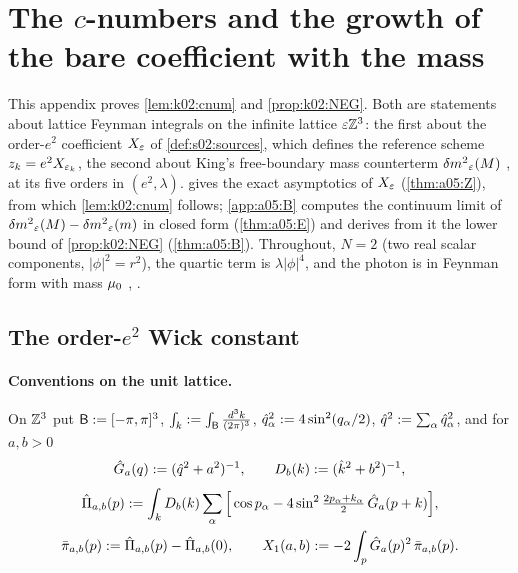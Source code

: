 \providecommand{\NEGinf}{\ensuremath{(\mathrm{NEG}_{\infty})}}
\providecommand{\BZ}{\ensuremath{\mathsf B}}
\providecommand{\Bc}{\ensuremath{B^{\mathrm c}}}
\providecommand{\Gh}{\ensuremath{\hat G}}
\providecommand{\intk}{\ensuremath{\int_{k}}}
\providecommand{\intp}{\ensuremath{\int_{p}}}

\section{The $c$-numbers and the growth of the bare coefficient with the mass}\label{app:a05_cnum_NEG}

This appendix proves \cref{lem:k02:cnum} and \cref{prop:k02:NEG}. Both are statements about lattice Feynman integrals on the infinite lattice $\varepsilon\mathbb Z^3$: the first about the order-$e^2$ coefficient $X_{\varepsilon}$ of \cref{def:s02:sources}, which defines the reference scheme $z_k=e^2X_{\varepsilon_k}$, the second about King's free-boundary mass counterterm ${\delta m^2}_{\varepsilon}(M)$ \cite[(3.32)--(3.33)]{K1}, \cite[p.~330]{K2} at its five orders in $(e^2,\lambda)$.  gives the exact asymptotics of $X_{\varepsilon}$ (\cref{thm:a05:Z}), from which \cref{lem:k02:cnum} follows; \cref{app:a05:B} computes the continuum limit of ${\delta m^2}_{\varepsilon}(M)-{\delta m^2}_{\varepsilon}(m)$ in closed form (\cref{thm:a05:E}) and derives from it the lower bound of \cref{prop:k02:NEG} (\cref{thm:a05:B}). Throughout, $N=2$ (two real scalar components, $|\phi|^2=r^2$), the quartic term is $\lambda|\phi|^4$, and the photon is in Feynman form with mass $\mu_0$ \cite[(2.4)]{K1}, \cite[(2.5)]{K2}.

\subsection{The order-$e^2$ Wick constant}\label{app:a05:A}

\paragraph{Conventions on the unit lattice.} On $\mathbb Z^3$ put $\BZ\defeq[-\pi,\pi]^3$, $\intk\defeq\int_\BZ\frac{d^3k}{(2\pi)^3}$, $\hat q_\alpha^2:=4\sin^2(q_\alpha/2)$, $\hat q^2:=\sum_\alpha\hat q_\alpha^2$, and for $a,b>0$
\[
\Gh_a(q)\defeq(\hat q^2+a^2)^{-1},\qquad D_b(k)\defeq(\hat k^2+b^2)^{-1},
\]
\begin{gather*}
\hat\Pi_{a,b}(p)\defeq\intk D_b(k)\sum_\alpha\Big[\cos p_\alpha-4\sin^2\tfrac{2p_\alpha+k_\alpha}2\,\Gh_a(p+k)\Big],\\
\bar\pi_{a,b}(p)\defeq\hat\Pi_{a,b}(p)-\hat\Pi_{a,b}(0),\qquad X_1(a,b)\defeq-2\intp\Gh_a(p)^2\,\bar\pi_{a,b}(p).
\end{gather*}

